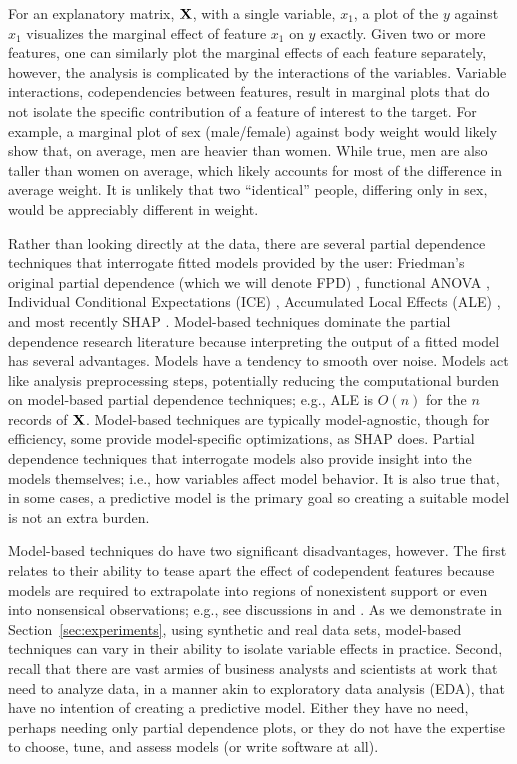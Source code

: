 \documentclass[smallextended]{svjour3}       %
\newcommand{\secref}[1]{Section~\ref{#1}}
\begin{document}
For an explanatory matrix, $\bf X$, with a single variable, $x_1$, a plot of the $y$ against $x_1$ visualizes the marginal effect of feature $x_1$ on $y$ exactly. Given two or more features, one can similarly plot the marginal effects of each feature separately, however, the analysis is complicated by the interactions of the variables.   Variable interactions, codependencies between features, result in marginal plots that do not isolate the specific contribution of a feature of interest to the target. For example, a marginal plot of sex (male/female) against body weight would likely show that, on average, men are heavier than women. While true, men are also taller than women on average, which likely accounts for most of the difference in average weight. It is unlikely that two ``identical'' people, differing only in sex, would be appreciably different in weight.  

Rather than looking directly at the data, there are several partial dependence techniques that interrogate fitted models provided by the user: Friedman's original partial dependence (which we will denote FPD) \cite{PDP}, functional ANOVA \cite{fanova}, Individual Conditional Expectations (ICE) \cite{ICE}, Accumulated Local Effects (ALE) \cite{ALE}, and most recently SHAP \cite{shap}.  Model-based techniques dominate the partial dependence research literature because interpreting the output of a fitted model  has several advantages. Models have a tendency to smooth over noise. Models act like analysis preprocessing steps, potentially reducing the computational burden on model-based partial dependence techniques; e.g., ALE is $O(n)$ for the $n$ records of $\bf X$. Model-based techniques are typically model-agnostic, though for efficiency, some provide model-specific optimizations, as SHAP does. Partial dependence techniques that interrogate models also provide insight into the models themselves; i.e., how variables affect model behavior.  It is also true that, in some cases, a predictive model is the primary goal so creating a suitable model is not an extra burden.

Model-based techniques do have two significant disadvantages, however. 
The first relates to their ability to tease apart the effect of codependent features because models are required to extrapolate into regions of nonexistent support or even into nonsensical observations; e.g., see discussions in \cite{ALE} and \cite{fanova}.  As we demonstrate in \secref{sec:experiments}, using synthetic and real data sets, model-based techniques can vary in their ability to isolate variable effects in practice.  Second, recall that there are vast armies of business analysts and scientists at work that need to analyze data, in a manner akin to exploratory data analysis (EDA), that have no intention of creating a predictive model.  Either they have no need, perhaps needing only partial dependence plots, or they do not have the expertise to choose, tune, and assess models (or write software at all).
\end{document}
